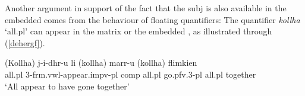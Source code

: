 \documentclass[output=paper]{LSP/langsci}
\begin{document}
Another argument in support of the fact that the {\sc subj} is also available in the embedded  comes from the behaviour of floating quantifiers: %
The quantifier \emph{kollha} `all.{\sc pl}' can appear in the matrix or the embedded , as illustrated through (\ref{dehergf}). %
 
\ea \label{dehergf}
\gll (Kollha)     j-i-dhr-u                            li        (kollha)      marr-u            (kollha) flimkien\\
     all.{\sc pl} 3-{\sc frm.vwl-}appear.{\sc impv-pl} {\sc comp} all.{\sc pl} go.{\sc pfv.3-pl}   all.{\sc pl}       together\\
\glt `All appear to have gone together'
\z



\end{document}
